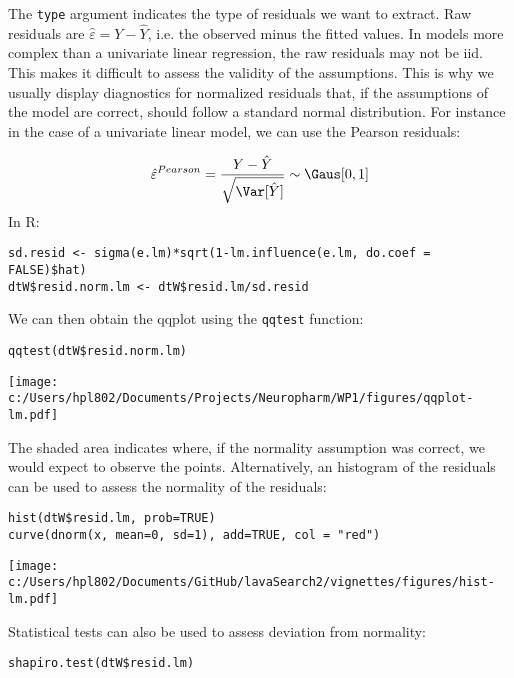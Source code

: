 \documentclass{article}
\begin{document}
The \texttt{type} argument indicates the type of residuals we want to
extract. Raw residuals are \(\hat{\varepsilon} = Y-\hat{Y}\), i.e. the observed minus the
fitted values. In models more complex than a univariate linear
regression, the raw residuals may not be iid. This makes it difficult
to assess the validity of the assumptions. This is why we usually
display diagnostics for normalized residuals that, if the assumptions
of the model are correct, should follow a standard normal
distribution. For instance in the case of a univariate linear model,
we can use the Pearson residuals:

\begin{align*}
\hat{\varepsilon}^{Pearson} = \frac{Y-\hat{Y}}{\sqrt{\Var[\hat{Y}]}} \sim \Gaus[0,1]
\end{align*}
In R:
\lstset{language=r,label= ,caption= ,captionpos=b,numbers=none}
\begin{lstlisting}
sd.resid <- sigma(e.lm)*sqrt(1-lm.influence(e.lm, do.coef = FALSE)$hat)
dtW$resid.norm.lm <- dtW$resid.lm/sd.resid
\end{lstlisting}

We can then obtain the qqplot using the \texttt{qqtest} function:
\lstset{language=r,label= ,caption= ,captionpos=b,numbers=none}
\begin{lstlisting}
qqtest(dtW$resid.norm.lm)
\end{lstlisting}

\begin{center}
\texttt{[image: c:/Users/hpl802/Documents/Projects/Neuropharm/WP1/figures/qqplot-lm.pdf]}
\end{center}

The shaded area indicates where, if the normality assumption was
correct, we would expect to observe the points. Alternatively, an
histogram of the residuals can be used to assess the normality of the
residuals:
\lstset{language=r,label= ,caption= ,captionpos=b,numbers=none}
\begin{lstlisting}
hist(dtW$resid.lm, prob=TRUE)
curve(dnorm(x, mean=0, sd=1), add=TRUE, col = "red")
\end{lstlisting}

\begin{center}
\texttt{[image: c:/Users/hpl802/Documents/GitHub/lavaSearch2/vignettes/figures/hist-lm.pdf]}
\end{center}

Statistical tests can also be used to assess deviation from normality:
\lstset{language=r,label= ,caption= ,captionpos=b,numbers=none}
\begin{lstlisting}
shapiro.test(dtW$resid.lm)
\end{lstlisting}
\end{document}
